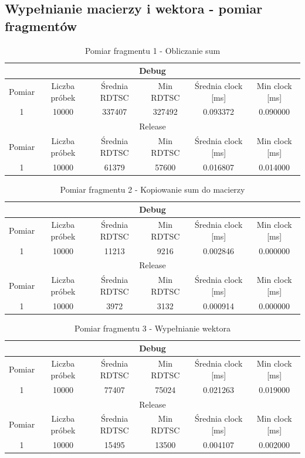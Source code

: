 \documentclass[12pt]{report}
\begin{document}
	\subsection{Wypełnianie macierzy i wektora - pomiar fragmentów}
	\begin{table}[H]
		\centering
		\caption{Pomiar fragmentu 1 - Obliczanie sum}
		\begin{tabular}{|c|c|c|c|c|c|} \hline
			\multicolumn{6}{|c|}{Debug} \\\hline
			Pomiar  & Liczba próbek & Średnia RDTSC & Min RDTSC & Średnia clock [ms] & Min clock [ms] \\\hline
			1 & 10000 & 337407 & 327492 & 0.093372 & 0.090000 \\\hline
			\hline
			\multicolumn{6}{|c|}{Release} \\\hline
			Pomiar  & Liczba próbek & Średnia RDTSC & Min RDTSC & Średnia clock [ms] & Min clock [ms] \\\hline
			1 & 10000 & 61379 & 57600 & 0.016807 & 0.014000 \\\hline
		\end{tabular}
	\end{table}

	\begin{table}[H]
		\centering
		\caption{Pomiar fragmentu 2 - Kopiowanie sum do macierzy}
		\begin{tabular}{|c|c|c|c|c|c|} \hline
			\multicolumn{6}{|c|}{Debug} \\\hline
			Pomiar  & Liczba próbek & Średnia RDTSC & Min RDTSC & Średnia clock [ms] & Min clock [ms] \\\hline
			1 & 10000 & 11213 & 9216 & 0.002846 & 0.000000 \\\hline
			\hline
			\multicolumn{6}{|c|}{Release} \\\hline
			Pomiar  & Liczba próbek & Średnia RDTSC & Min RDTSC & Średnia clock [ms] & Min clock [ms] \\\hline
			1 & 10000 & 3972 & 3132 & 0.000914 & 0.000000 \\\hline
		\end{tabular}
	\end{table}

	\begin{table}[H]
		\centering
		\caption{Pomiar fragmentu 3 - Wypełnianie wektora}
		\begin{tabular}{|c|c|c|c|c|c|} \hline
			\multicolumn{6}{|c|}{Debug} \\\hline
			Pomiar  & Liczba próbek & Średnia RDTSC & Min RDTSC & Średnia clock [ms] & Min clock [ms] \\\hline
			1 & 10000 & 77407 & 75024 & 0.021263 & 0.019000 \\\hline
			\hline
			\multicolumn{6}{|c|}{Release} \\\hline
			Pomiar  & Liczba próbek & Średnia RDTSC & Min RDTSC & Średnia clock [ms] & Min clock [ms] \\\hline
			1 & 10000 & 15495 & 13500 & 0.004107 & 0.002000 \\\hline
		\end{tabular}
	\end{table}
	
\end{document}
